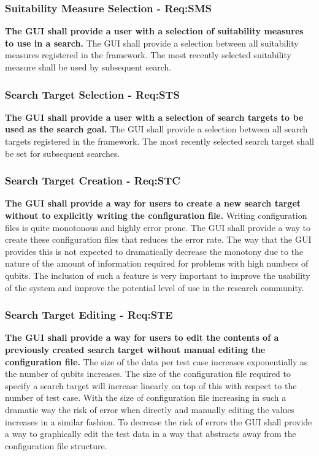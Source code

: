 \subsubsection{Suitability Measure Selection - Req:SMS}
\label{sec:reqsms}
\textbf{The GUI shall provide a user with a selection of suitability measures to use in a search.}
The GUI shall provide a selection between all suitability measures registered in the framework.
The most recently selected suitability measure shall be used by subsequent search.

\subsubsection{Search Target Selection - Req:STS}
\label{sec:reqsts}
\textbf{The GUI shall provide a user with a selection of search targets to be used as the search goal.}
The GUI shall provide a selection between all search targets registered in the framework.
The most recently selected search target shall be set for subsequent searches.

\subsubsection{Search Target Creation - Req:STC}
\label{sec:reqstc}
\textbf{The GUI shall provide a way for users to create a new search target without to explicitly writing the configuration file.}
Writing configuration files is quite monotonous and highly error prone.
The GUI shall provide a way to create these configuration files that reduces the error rate.
The way that the GUI provides this is not expected to dramatically decrease the monotony due to the nature of the amount of information required for problems with high numbers of qubits.
The inclusion of such a feature is very important to improve the usability of the system and improve the potential level of use in the research community.

\subsubsection{Search Target Editing - Req:STE}
\label{sec:reqste}
\textbf{The GUI shall provide a way for users to edit the contents of a previously created search target without manual editing the configuration file.}
The size of the data per test case increases exponentially as the number of qubits increases.
The size of the configuration file required to specify a search target will increase linearly on top of this with respect to the number of test case.
With the size of configuration file increasing in such a dramatic way the risk of error when directly and manually editing the values increases in a similar fashion.
To decrease the risk of errors the GUI shall provide a way to graphically edit the test data in a way that abstracts away from the configuration file structure.

